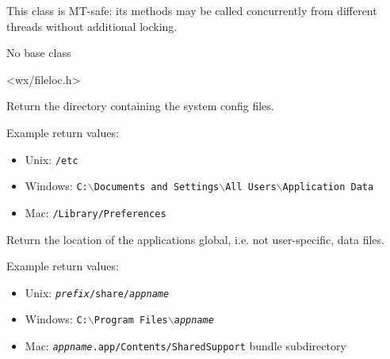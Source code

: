 This class is MT-safe: its methods may be called concurrently from different
threads without additional locking.


No base class


<wx/fileloc.h>




\label{wxstandardpathsgetconfigdir}


Return the directory containing the system config files.

Example return values:
\begin{itemize}
    \item Unix: \texttt{/etc}
    \item Windows: \texttt{C:$\backslash$Documents and Settings$\backslash$All Users$\backslash$Application Data}
    \item Mac: \texttt{/Library/Preferences}
\end{itemize}




\label{wxstandardpathsgetdatadir}


Return the location of the applications global, i.e. not user-specific,
data files.

Example return values:
\begin{itemize}
    \item Unix: \texttt{\textit{prefix}/share/\textit{appname}}
    \item Windows: \texttt{C:$\backslash$Program Files$\backslash$\textit{appname}}
    \item Mac: \texttt{\textit{appname}.app/Contents/SharedSupport} bundle subdirectory
\end{itemize}




\label{wxstandardpathsgetinstallprefix}



